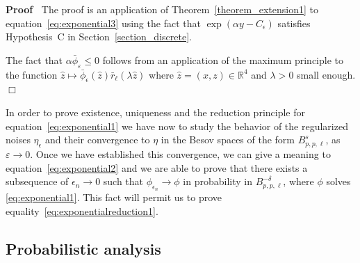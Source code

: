 \documentclass[a4paper,10pt]{article}
\newenvironment{proof}{\noindent\textbf{Proof\ }}{\hspace*{\fill}$\Box$\medskip}
\begin{document}
\begin{proof}
  The proof is an application of Theorem~\ref{theorem_extension1} to
  equation~{\eqref{eq:exponential3}} using the fact that $\exp (\alpha y -
  C_{\epsilon})$ satisfies Hypothesis~C in Section~\ref{section_discrete}.
  
  The fact that $\alpha \bar{\phi}_{\varepsilon} \leqslant 0$ follows from an
  application of the maximum principle to the function $\hat{z} \mapsto
  \bar{\phi}_{\epsilon} (\hat{z})  \bar{r}_{\ell} (\lambda \hat{z})$ where
  $\hat{z} = (x, z) \in \mathbb{R}^4$ and $\lambda > 0$ small enough.
\end{proof}

In order to prove existence, uniqueness and the reduction principle for
equation~{\eqref{eq:exponential1}} we have now to study the behavior of the
regularized noises $\eta_{\epsilon}$ and their convergence to $\eta$ in the
Besov spaces of the form $B^s_{p, p, \ell}$, as $\varepsilon \rightarrow 0$.
Once we have established this convergence, we can give a meaning to
equation~{\eqref{eq:exponential2}} and we are able to prove that there exists
a subsequence of $\epsilon_n \rightarrow 0$ such that $\phi_{\epsilon_n}
\rightarrow \phi$ in probability in $B^{- \delta}_{p, p, \ell}$, where $\phi$
solves {\eqref{eq:exponential1}}. This fact will permit us to prove
equality~{\eqref{eq:exponentialreduction1}}.

\subsection{Probabilistic analysis}\label{subsection_probabilistic}
\end{document}
